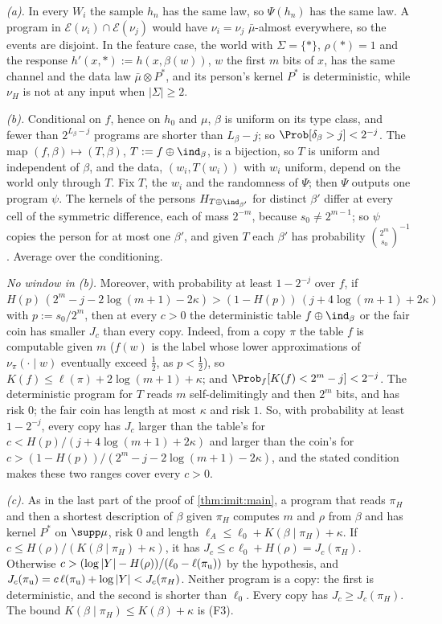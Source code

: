 \emph{(a).} In every $W_i$ the sample $h_n$ has the same law, so $\Psi(h_n)$ has the same law. A program in $\mathcal E(\nu_i)\cap\mathcal E(\nu_j)$ would have $\nu_i=\nu_j$ $\bar\mu$-almost everywhere, so the events are disjoint. In the feature case, the world with $\Sigma=\{\ast\}$, $\rho(\ast)=1$ and the response $h'(x,\ast):=h(x,\beta(w))$, $w$ the first $m$ bits of $x$, has the same channel and the data law $\bar\mu\otimes P^*$, and its person's kernel $P^*$ is deterministic, while $\nu_H$ is not at any input when $|\Sigma|\ge2$.

\emph{(b).} Conditional on $f$, hence on $h_0$ and $\mu$, $\beta$ is uniform on its type class, and fewer than $2^{L_\beta-j}$ programs are shorter than $L_\beta-j$; so $\Prob[\delta_\beta>j]<2^{-j}$. The map $(f,\beta)\mapsto(T,\beta)$, $T:=f\oplus\ind_\beta$, is a bijection, so $T$ is uniform and independent of $\beta$, and the data, $(w_i,T(w_i))$ with $w_i$ uniform, depend on the world only through $T$. Fix $T$, the $w_i$ and the randomness of $\Psi$; then $\Psi$ outputs one program $\psi$. The kernels of the persons $H_{T\oplus\ind_{\beta'}}$ for distinct $\beta'$ differ at every cell of the symmetric difference, each of mass $2^{-m}$, because $s_0\ne2^{m-1}$; so $\psi$ copies the person for at most one $\beta'$, and given $T$ each $\beta'$ has probability $\binom{2^m}{s_0}^{-1}$. Average over the conditioning.

\emph{No window in (b).} Moreover, with probability at least $1-2^{-j}$ over $f$, if $H(p)\,(2^m-j-2\log(m+1)-2\kappa)>(1-H(p))\,(j+4\log(m+1)+2\kappa)$ with $p:=s_0/2^m$, then at every $c>0$ the deterministic table $f\oplus\ind_\beta$ or the fair coin has smaller $J_c$ than every copy. Indeed, from a copy $\pi$ the table $f$ is computable given $m$ ($f(w)$ is the label whose lower approximations of $\nu_\pi(\cdot\mid w)$ eventually exceed $\frac12$, as $p<\frac12$), so $K(f)\le\ell(\pi)+2\log(m+1)+\kappa$; and $\Prob_f[K(f)<2^m-j]<2^{-j}$. The deterministic program for $T$ reads $m$ self-delimitingly and then $2^m$ bits, and has risk $0$; the fair coin has length at most $\kappa$ and risk $1$. So, with probability at least $1-2^{-j}$, every copy has $J_c$ larger than the table's for $c<H(p)/(j+4\log(m+1)+2\kappa)$ and larger than the coin's for $c>(1-H(p))/(2^m-j-2\log(m+1)-2\kappa)$, and the stated condition makes these two ranges cover every $c>0$.

\emph{(c).} As in the last part of the proof of \cref{thm:imit:main}, a program that reads $\pi_H$ and then a shortest description of $\beta$ given $\pi_H$ computes $m$ and $\rho$ from $\beta$ and has kernel $P^*$ on $\supp\mu$, risk $0$ and length $\ell_A\le\ell_0+K(\beta\mid\pi_H)+\kappa$. If $c\le H(\rho)/(K(\beta\mid\pi_H)+\kappa)$, it has $J_c\le c\,\ell_0+H(\rho)=J_c(\pi_H)$. Otherwise $c>(\log|Y|-H(\rho))/(\ell_0-\ell(\pi_{\rm u}))$ by the hypothesis, and $J_c(\pi_{\rm u})=c\,\ell(\pi_{\rm u})+\log|Y|<J_c(\pi_H)$. Neither program is a copy: the first is deterministic, and the second is shorter than $\ell_0$. Every copy has $J_c\ge J_c(\pi_H)$. The bound $K(\beta\mid\pi_H)\le K(\beta)+\kappa$ is (F3).

